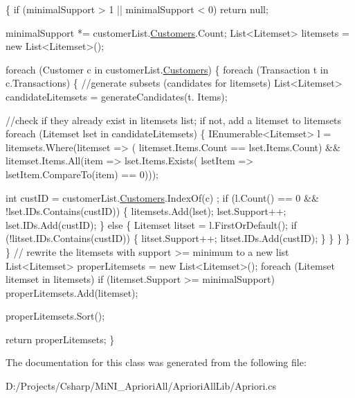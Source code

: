 \begin{DoxyCode}
        \{
            \textcolor{keywordflow}{if} (minimalSupport > 1 || minimalSupport < 0)
                \textcolor{keywordflow}{return} null; 
            
            minimalSupport *= customerList.\hyperlink{class_apriori_all_lib_1_1_customer_list_a4fd2a16a984844e61ffc60b327e6534a}{Customers}.Count;
            List<Litemset> litemsets = \textcolor{keyword}{new} List<Litemset>();

            \textcolor{keywordflow}{foreach} (Customer c \textcolor{keywordflow}{in} customerList.\hyperlink{class_apriori_all_lib_1_1_customer_list_a4fd2a16a984844e61ffc60b327e6534a}{Customers})
            \{
                \textcolor{keywordflow}{foreach} (Transaction t \textcolor{keywordflow}{in} c.Transactions)
                \{
                    \textcolor{comment}{//generate subsets (candidates for litemsets)}
                    List<Litemset> candidateLitemsets = generateCandidates(t.
      Items);

                    \textcolor{comment}{//check if they already exist in litemsets list; if not,
       add a litemset to litemsets}
                    \textcolor{keywordflow}{foreach} (Litemset lset \textcolor{keywordflow}{in} candidateLitemsets)
                    \{
                        IEnumerable<Litemset> l = litemsets.Where(litemset => (
      litemset.Items.Count == lset.Items.Count) &&
                            litemset.Items.All(item => lset.Items.Exists(
      lsetItem => lsetItem.CompareTo(item) == 0)));

                        \textcolor{keywordtype}{int} custID = customerList.\hyperlink{class_apriori_all_lib_1_1_customer_list_a4fd2a16a984844e61ffc60b327e6534a}{Customers}.IndexOf(c)
      ;
                        \textcolor{keywordflow}{if} (l.Count() == 0 && !lset.IDs.Contains(custID))
                        \{
                            litemsets.Add(lset);
                            lset.Support++;
                            lset.IDs.Add(custID);
                        \}
                        \textcolor{keywordflow}{else}
                        \{
                            Litemset litset = l.FirstOrDefault();
                            \textcolor{keywordflow}{if} (!litset.IDs.Contains(custID))
                            \{
                                litset.Support++;
                                litset.IDs.Add(custID);
                            \}
                        \}     
                    \}
                \}
            \}
            \textcolor{comment}{// rewrite the litemsets with support >= minimum to a new list}
            List<Litemset> properLitemsets = \textcolor{keyword}{new} List<Litemset>();
            \textcolor{keywordflow}{foreach} (Litemset litemset \textcolor{keywordflow}{in} litemsets)
                \textcolor{keywordflow}{if} (litemset.Support >= minimalSupport)
                    properLitemsets.Add(litemset);

            properLitemsets.Sort();

            \textcolor{keywordflow}{return} properLitemsets;
        \}
\end{DoxyCode}


The documentation for this class was generated from the following file\-:\begin{DoxyCompactItemize}
\item 
D\-:/\-Projects/\-Csharp/\-Mi\-N\-I\-\_\-\-Apriori\-All/\-Apriori\-All\-Lib/Apriori.\-cs\end{DoxyCompactItemize}
